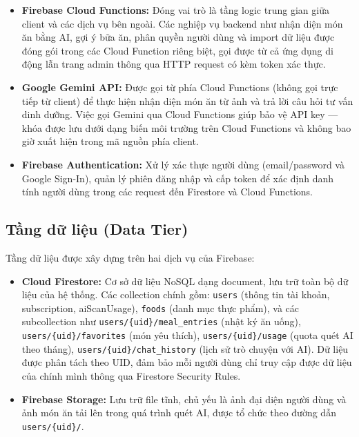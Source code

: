 \begin{itemize}
    \item \textbf{Firebase Cloud Functions:} Đóng vai trò là tầng logic trung gian giữa client và các dịch vụ bên ngoài. Các nghiệp vụ backend như nhận diện món ăn bằng AI, gợi ý bữa ăn, phân quyền người dùng và import dữ liệu được đóng gói trong các Cloud Function riêng biệt, gọi được từ cả ứng dụng di động lẫn trang admin thông qua HTTP request có kèm token xác thực.
    \item \textbf{Google Gemini API:} Được gọi từ phía Cloud Functions (không gọi trực tiếp từ client) để thực hiện nhận diện món ăn từ ảnh và trả lời câu hỏi tư vấn dinh dưỡng. Việc gọi Gemini qua Cloud Functions giúp bảo vệ API key — khóa được lưu dưới dạng biến môi trường trên Cloud Functions và không bao giờ xuất hiện trong mã nguồn phía client.
    \item \textbf{Firebase Authentication:} Xử lý xác thực người dùng (email/password và Google Sign-In), quản lý phiên đăng nhập và cấp token để xác định danh tính người dùng trong các request đến Firestore và Cloud Functions.
\end{itemize}

\subsection{Tầng dữ liệu (Data Tier)}

Tầng dữ liệu được xây dựng trên hai dịch vụ của Firebase:

\begin{itemize}
    \item \textbf{Cloud Firestore:} Cơ sở dữ liệu NoSQL dạng document, lưu trữ toàn bộ dữ liệu của hệ thống. Các collection chính gồm: \texttt{users} (thông tin tài khoản, subscription, aiScanUsage), \texttt{foods} (danh mục thực phẩm), và các subcollection như \texttt{users/\{uid\}/meal\_entries} (nhật ký ăn uống), \texttt{users/\{uid\}/favorites} (món yêu thích), \texttt{users/\{uid\}/usage} (quota quét AI theo tháng), \texttt{users/\{uid\}/chat\_history} (lịch sử trò chuyện với AI). Dữ liệu được phân tách theo UID, đảm bảo mỗi người dùng chỉ truy cập được dữ liệu của chính mình thông qua Firestore Security Rules.
    \item \textbf{Firebase Storage:} Lưu trữ file tĩnh, chủ yếu là ảnh đại diện người dùng và ảnh món ăn tải lên trong quá trình quét AI, được tổ chức theo đường dẫn \texttt{users/\{uid\}/}.
\end{itemize}

